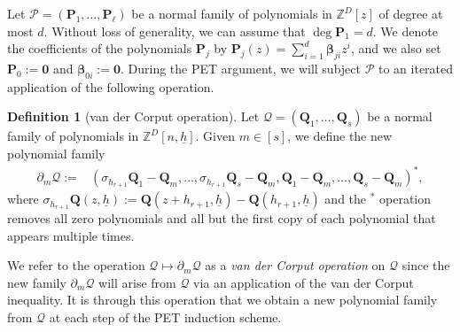 \documentclass[11pt]{amsart}
\theoremstyle{definition}
\newtheorem{definition}[lemma]{Definition}
\newcommand{\Z}{{\mathbb Z}}
\newcommand{\CP}{{\mathcal P}}
\newcommand{\CQ}{{\mathcal Q}}
\newcommand{\bp}{{\textbf{P}}}
\newcommand{\p}{{\textbf{P}}}
\newcommand{\q}{{\textbf{Q}}}
\newcommand{\bbeta}{{\boldsymbol{\beta}}}
\newcommand{\uh}{{\underline{h}}}
\begin{document}
Let $\CP = (\p_1, \ldots, \p_\ell)$ be a normal family of polynomials in $\Z^D[z]$ of degree at most $d$. Without loss of generality, we can assume that $\deg\p_1 = d$. 
We denote the coefficients of the polynomials $\p_j$ by $\bp_j(z) = \sum_{i=1}^d \bbeta_{ji}z^i$, and we  also set $\bp_0 := \mathbf{0}$ and $\bbeta_{0i} := \mathbf{0}$. During the PET argument, we will subject $\CP$ to an iterated application of the following operation.
      \begin{definition}[van der Corput operation]
          Let $\CQ = (\q_1, \ldots, \q_s)$ be a normal family of polynomials in $\Z^D[n,\uh]$. Given $m\in[s]$, we define the new polynomial family
      \begin{align*}
            \partial_m\CQ := &(\sigma_{h_{r+1}}{\q}_1-{\q}_m, \ldots, \sigma_{h_{r+1}}{\q}_s - {\q}_m, {\q}_1-{\q}_m, \ldots,  {\q}_s-{\q}_m)^*,
      \end{align*}
      where $\sigma_{h_{r+1}}\q(z, \uh) := \q(z+h_{r+1}, \uh) - \q(h_{r+1}, \uh)$
      and the $^*$ operation removes all zero polynomials and all but the first copy of each polynomial that appears multiple times.
            \end{definition}
            We refer to the operation $\CQ\mapsto \partial_m \CQ$ as a \textit{van der Corput operation} on $\CQ$ since the new family $\partial_m \CQ$ will arise from $\CQ$ via an application of the van der Corput inequality. It is through this operation that we obtain a new polynomial family from $\CQ$ at each step of the PET induction scheme.  
\end{document}
